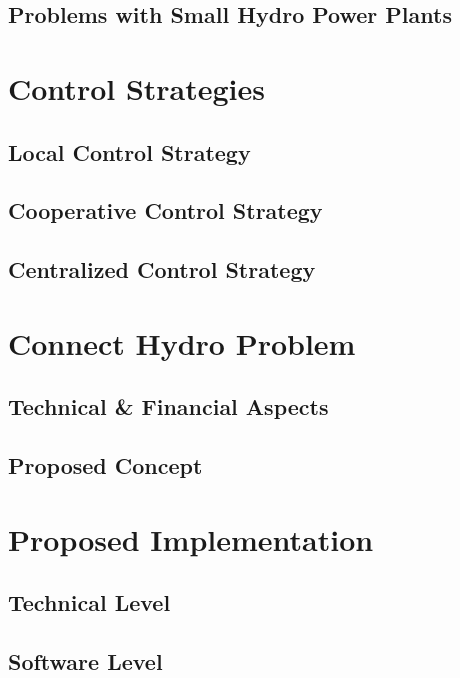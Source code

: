 \subsection{Problems with Small Hydro Power Plants}
\section{Control Strategies}
\subsection{Local Control Strategy}
\subsection{Cooperative Control Strategy}
\subsection{Centralized Control Strategy}

\section{Connect Hydro Problem}
\subsection{Technical \& Financial Aspects}
\subsection{Proposed Concept}

\section{Proposed Implementation}
\subsection{Technical Level}
\subsection{Software Level}